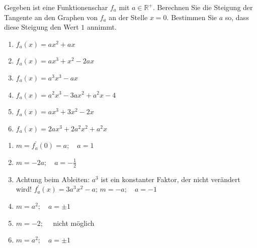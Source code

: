 \documentclass[11pt,a4paper,twoside,fleqn]{article}
\begin{document}
\begin{question}\label{scharen:tangente}
  
  Gegeben ist eine Funktionenschar $f_a$ mit $a\in\mathbb{R}^+$.
  Berechnen Sie die Steigung der Tangente an den Graphen von $f_a$ an
  der Stelle $x=0$. Bestimmen Sie $a$ so, dass diese Steigung den Wert
  $1$ annimmt.  
  \begin{multicols}{2}
    \begin{enumerate}\itemsep0pt
    \item $f_a(x)=ax^2+ax$
    \item $f_a(x)=ax^3+x^2-2ax$
    \item $f_a(x)=a^3x^3- ax$
    \item $f_a(x)=a^2x^3-3ax^2+a^2x-4$
    \item $f_a(x)=ax^3+3x^2-2x$
    \item $f_a(x)=2ax^3+2a^2x^2+a^2x$
    \end{enumerate}
  \end{multicols}
\end{question}
\begin{solution}
  \begin{multicols}{2}
    \begin{enumerate}
    \item $m=f^\prime_a(0)=a;\quad a=1$
    \item $m=-2a;\quad a=- \frac 1 2$
    \item Achtung beim Ableiten: $a^3$ ist ein konstanter Faktor, der
      nicht verändert wird! $f^\prime_a(x)=3a^3x^2-a$; $m=-a;\quad a=-1$
    \item $m=a^2;\quad a=\pm 1$
    \item $m=-2;\quad$ nicht möglich
    \item $m=a^2;\quad a=\pm 1$
    \end{enumerate}
  \end{multicols}
\end{solution}
\end{document}
